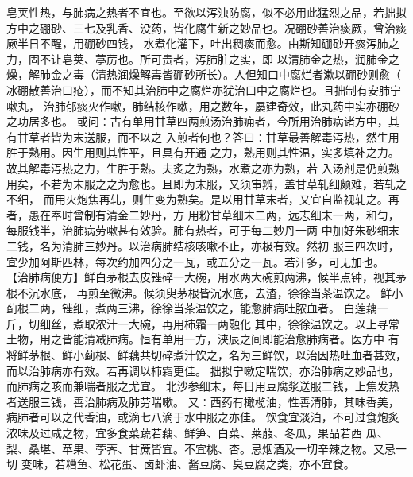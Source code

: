 \documentclass[a4paper,12pt,UTF8,twoside]{ctexbook}
\begin{document}
皂荚性热，与肺病之热者不宜也。至欲以泻浊防腐，似不必用此猛烈之品，若拙拟 
方中之硼砂、三七及乳香、没药，皆化腐生新之妙品也。况硼砂善治痰厥，曾治痰厥半日不醒，用硼砂四钱， 
水煮化灌下，吐出稠痰而愈。由斯知硼砂开痰泻肺之力，固不让皂荚、葶苈也。所可贵者，泻肺脏之实，即 
以清肺金之热，润肺金之燥，解肺金之毒（清热润燥解毒皆硼砂所长）。人但知口中腐烂者漱以硼砂则愈（ 
冰硼散善治口疮），而不知其治肺中之腐烂亦犹治口中之腐烂也。且拙制有安肺宁嗽丸， 
治肺郁痰火作嗽，肺结核作嗽，用之数年，屡建奇效，此丸药中实亦硼砂之功居多也。 
或问∶古有单用甘草四两煎汤治肺痈者，今所用治肺病诸方中，其有甘草者皆为末送服，而不以之 
入煎者何也？答曰∶甘草最善解毒泻热，然生用胜于熟用。因生用则其性平，且具有开通 
之力，熟用则其性温，实多填补之力。故其解毒泻热之力，生胜于熟。夫炙之为熟，水煮之亦为熟，若 
入汤剂是仍煎熟用矣，不若为末服之之为愈也。且即为末服，又须审辨，盖甘草轧细颇难，若轧之不细， 
而用火炮焦再轧，则生变为熟矣。是以用甘草末者，又宜自监视轧之。再者，愚在奉时曾制有清金二妙丹，方 
用粉甘草细末二两，远志细末一两，和匀，每服钱半，治肺病劳嗽甚有效验。肺有热者，可于每二妙丹一两 
中加好朱砂细末二钱，名为清肺三妙丹。以治病肺结核咳嗽不止，亦极有效。然初 
服三四次时，宜少加阿斯匹林，每次约加四分之一瓦，或五分之一瓦。若汗多，可无加也。 
【治肺病便方】鲜白茅根去皮锉碎一大碗，用水两大碗煎两沸，候半点钟，视其茅根不沉水底， 
再煎至微沸。候须臾茅根皆沉水底，去渣，徐徐当茶温饮之。 
鲜小蓟根二两，锉细，煮两三沸，徐徐当茶温饮之，能愈肺病吐脓血者。 
白莲藕一斤，切细丝，煮取浓汁一大碗，再用柿霜一两融化 
其中，徐徐温饮之。以上寻常土物，用之皆能清减肺病。恒有单用一方，浃辰之间即能治愈肺病者。医方中 
有将鲜茅根、鲜小蓟根、鲜藕共切碎煮汁饮之，名为三鲜饮，以治因热吐血者甚效， 
而以治肺病亦有效。若再调以柿霜更佳。 
拙拟宁嗽定喘饮，亦治肺病之妙品也，而肺病之咳而兼喘者服之尤宜。 
北沙参细末，每日用豆腐浆送服二钱，上焦发热者送服三钱，善治肺病及肺劳喘嗽。 
又∶西药有橄榄油，性善清肺，其味香美，病肺者可以之代香油，或滴七八滴于水中服之亦佳。 
饮食宜淡泊，不可过食炮炙浓味及过咸之物，宜多食菜蔬若藕、鲜笋、白菜、莱菔、冬瓜，果品若西 
瓜、梨、桑堪、苹果、荸荠、甘蔗皆宜。不宜桃、杏。忌烟酒及一切辛辣之物。又忌一切 
变味，若糟鱼、松花蛋、卤虾油、酱豆腐、臭豆腐之类，亦不宜食。 
\end{document}
